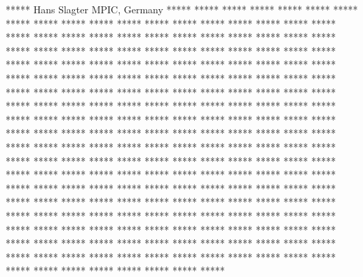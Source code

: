 \begin{conf-abstract}
{*****}
{Hans Slagter}
{MPIC, Germany}
{***** ***** ***** ***** ***** ***** ***** ***** ***** ***** ***** ***** ***** ***** ***** ***** ***** ***** ***** ***** ***** ***** ***** ***** ***** ***** ***** ***** ***** ***** ***** ***** ***** ***** ***** ***** ***** ***** ***** ***** ***** ***** ***** ***** ***** ***** ***** ***** ***** ***** ***** ***** ***** ***** ***** ***** ***** ***** ***** ***** ***** ***** ***** ***** ***** ***** ***** ***** ***** ***** ***** ***** ***** ***** ***** ***** ***** ***** ***** ***** ***** ***** ***** ***** ***** ***** ***** ***** ***** ***** ***** ***** ***** ***** ***** ***** ***** ***** ***** ***** ***** ***** ***** ***** ***** ***** ***** ***** ***** ***** ***** ***** ***** ***** ***** ***** ***** ***** ***** ***** ***** ***** ***** ***** ***** ***** ***** ***** ***** ***** ***** ***** ***** ***** ***** ***** ***** ***** ***** ***** ***** ***** ***** ***** ***** ***** ***** ***** ***** ***** ***** ***** ***** ***** ***** ***** ***** ***** ***** ***** ***** ***** ***** ***** ***** ***** ***** ***** ***** ***** ***** ***** ***** ***** ***** ***** ***** ***** ***** ***** ***** ***** ***** ***** ***** ***** ***** ***** ***** ***** ***** ***** ***** ***** ***** ***** ***** ***** ***** ***** ***** ***** ***** ***** ***** ***** ***** ***** ***** ***** ***** ***** ***** ***** ***** ***** ***** ***** ***** ***** ***** ***** ***** ***** ***** ***** ***** ***** ***** ***** *****}

\end{conf-abstract}
